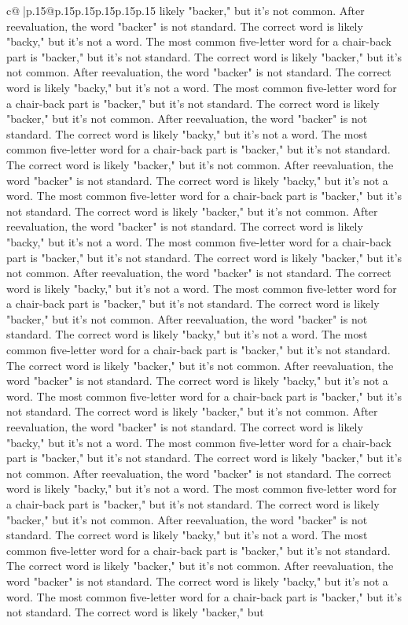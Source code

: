 \documentclass{article}
\begin{document}
{\begin{supertabular}{c@{$\;$}|p{.15\linewidth}@{}p{.15\linewidth}p{.15\linewidth}p{.15\linewidth}p{.15\linewidth}p{.15\linewidth}}
{{{likely "backer," but it's not common. After reevaluation, the word "backer" is not standard. The correct word is likely "backy," but it's not a word. The most common five{-}letter word for a chair{-}back part is "backer," but it's not standard. The correct word is likely "backer," but it's not common. After reevaluation, the word "backer" is not standard. The correct word is likely "backy," but it's not a word. The most common five{-}letter word for a chair{-}back part is "backer," but it's not standard. The correct word is likely "backer," but it's not common. After reevaluation, the word "backer" is not standard. The correct word is likely "backy," but it's not a word. The most common five{-}letter word for a chair{-}back part is "backer," but it's not standard. The correct word is likely "backer," but it's not common. After reevaluation, the word "backer" is not standard. The correct word is likely "backy," but it's not a word. The most common five{-}letter word for a chair{-}back part is "backer," but it's not standard. The correct word is likely "backer," but it's not common. After reevaluation, the word "backer" is not standard. The correct word is likely "backy," but it's not a word. The most common five{-}letter word for a chair{-}back part is "backer," but it's not standard. The correct word is likely "backer," but it's not common. After reevaluation, the word "backer" is not standard. The correct word is likely "backy," but it's not a word. The most common five{-}letter word for a chair{-}back part is "backer," but it's not standard. The correct word is likely "backer," but it's not common. After reevaluation, the word "backer" is not standard. The correct word is likely "backy," but it's not a word. The most common five{-}letter word for a chair{-}back part is "backer," but it's not standard. The correct word is likely "backer," but it's not common. After reevaluation, the word "backer" is not standard. The correct word is likely "backy," but it's not a word. The most common five{-}letter word for a chair{-}back part is "backer," but it's not standard. The correct word is likely "backer," but it's not common. After reevaluation, the word "backer" is not standard. The correct word is likely "backy," but it's not a word. The most common five{-}letter word for a chair{-}back part is "backer," but it's not standard. The correct word is likely "backer," but it's not common. After reevaluation, the word "backer" is not standard. The correct word is likely "backy," but it's not a word. The most common five{-}letter word for a chair{-}back part is "backer," but it's not standard. The correct word is likely "backer," but it's not common. After reevaluation, the word "backer" is not standard. The correct word is likely "backy," but it's not a word. The most common five{-}letter word for a chair{-}back part is "backer," but it's not standard. The correct word is likely "backer," but it's not common. After reevaluation, the word "backer" is not standard. The correct word is likely "backy," but it's not a word. The most common five{-}letter word for a chair{-}back part is "backer," but it's not standard. The correct word is likely "backer," but }}}
\end{supertabular}}
\end{document}
